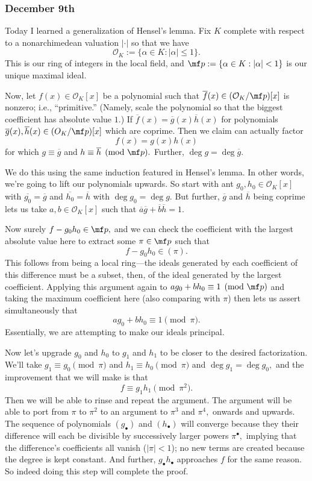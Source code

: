 \subsubsection{December 9th}
Today I learned a generalization of Hensel's lemma. Fix $K$ complete with respect to a nonarchimedean valuation $|\cdot|$ so that we have
\[\mathcal O_K:=\{\alpha\in K:|\alpha|\le1\}.\]
This is our ring of integers in the local field, and $\mf p:=\{\alpha\in K:|\alpha|<1\}$ is our unique maximal ideal.

Now, let $f(x)\in\mathcal O_K[x]$ be a polynomial such that $\overline f(x)\in(\mathcal O_K/\mf p)[x]$ is nonzero; i.e., ``primitive.'' (Namely, scale the polynomial so that the biggest coefficient has absolute value $1.$) If $\overline f(x)=\overline g(x)\overline h(x)$ for polynomials $\overline g(x),\overline h(x)\in\mathcal(O_K/\mf p)[x]$ which are coprime. Then we claim can actually factor
\[f(x)=g(x)h(x)\]
for which $g\equiv\overline g$ and $h\equiv\overline h\pmod{\mf p}.$ Further, $\deg g=\deg\overline g.$

We do this using the same induction featured in Hensel's lemma. In other words, we're going to lift our polynomials upwards. So start with ant $g_0,h_0\in\mathcal O_K[x]$ with $\overline{g_0}=\overline g$ and $\overline{h_0}=\overline h$ with $\deg g_0=\deg g.$ But further, $\overline g$ and $\overline h$ being coprime lets us take $a,b\in\mathcal O_K[x]$ such that $\overline a\overline g+\overline b\overline h=1.$

Now surely $f-g_0h_0\in\mf p,$ and we can check the coefficient with the largest absolute value here to extract some $\pi\in\mf p$ such that
\[f-g_0h_0\in(\pi).\]
This follows from being a local ring---the ideals generated by each coefficient of this difference must be a subset, then, of the ideal generated by the largest coefficient. Applying this argument again to $ag_0+bh_0\equiv1\pmod{\mf p}$ and taking the maximum coefficient here (also comparing with $\pi$) then lets us assert simultaneously that
\[ag_0+bh_0\equiv1\pmod\pi.\]
Essentially, we are attempting to make our ideals principal.

Now let's upgrade $g_0$ and $h_0$ to $g_1$ and $h_1$ to be closer to the desired factorization. We'll take $g_1\equiv g_0\pmod\pi$ and $h_1\equiv h_0\pmod\pi$ and $\deg g_1=\deg g_0,$ and the improvement that we will make is that
\[f\equiv g_1h_1\pmod{\pi^2}.\]
Then we will be able to rinse and repeat the argument. The argument will be able to port from $\pi$ to $\pi^2$ to an argument to $\pi^3$ and $\pi^4,$ onwards and upwards. The sequence of polynomials $(g_\bullet)$ and $(h_\bullet)$ will converge because they their difference will each be divisible by successively larger powers $\pi^\bullet,$ implying that the difference's coefficients all vanish ($|\pi|<1$); no new terms are created because the degree is kept constant. And further, $g_\bullet h_\bullet$ approaches $f$ for the same reason. So indeed doing this step will complete the proof.

